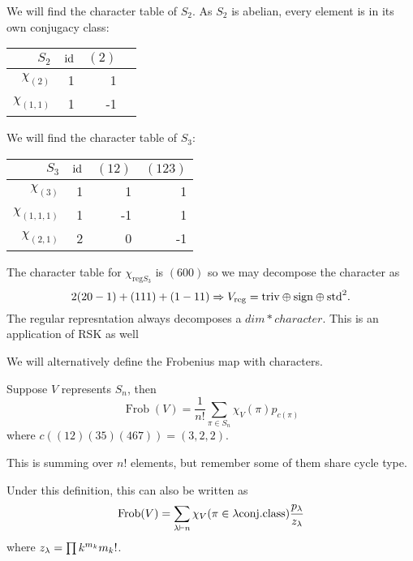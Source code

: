 \documentclass[12pt]{memoir}
\DeclareMathOperator{\Frob}{Frob}
\begin{document}
\begin{Ex}
    We will find the character table of $S_2$. As $S_2$ is abelian, every element is in its own conjugacy class:
    \begin{table*}[h]
        \centering
        \begin{tabular}{rrrr}\toprule
            $S_2$ &$\operatorname{id}$& $(2)$\\ \midrule
            $\chi_{(2)}$&1 & 1\\
            $\chi_{(1,1)}$&1 & -1\\
       \bottomrule
        \end{tabular}
        \end{table*}
\end{Ex}


\begin{Ex}
    We will find the character table of $S_3$:
    \begin{table*}[h]
        \centering
        \begin{tabular}{rrrr}\toprule
            $S_3$ &$\operatorname{id}$& $(12)$&$(123)$\\ \midrule
            $\chi_{(3)}$&1 & 1&1\\
            $\chi_{(1,1,1)}$&1 & -1&1\\
            $\chi_{(2,1)}$&2 & 0&-1\\
       \bottomrule
        \end{tabular}
        \end{table*}
\end{Ex}

The character table for $\chi_{\text{reg}S_3}$ is $(600)$ so we may decompose the character as 
$$2(20-1)+(111)+(1-11)\Rightarrow V_{\text{reg}}=\text{triv}\oplus\text{sign}\oplus\text{std}^2.$$
The regular represntation always decomposes a $dim*character$. This is an application of RSK as well 

We will alternatively define the Frobenius map with characters.
\begin{Def}
    Suppose $V$ represents $S_n$, then 
    $$\Frob(V)=\frac{1}{n!}\sum_{\pi\in S_n}\chi_V(\pi)p_{c(\pi)}$$
    where $c((12)(35)(467))=(3,2,2)$.
\end{Def}

This is summing over $n!$ elements, but remember some of them share cycle type. 

\begin{Lem}
    Under this definition, this can also be written as 
    $$\Frob(V)=\sum_{\la\vdash n}\chi_V(\pi\in\la\text{conj.class})\frac{p_\la}{z_\la}$$
    where $z_\lambda=\prod k^{m_k}m_k!$.
\end{Lem}
\end{document}
